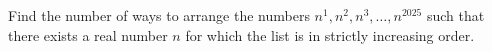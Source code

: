 Find the number of ways to arrange the numbers $n^1,n^2,n^3,\dots,n^{2025}$ such that there exists a real number $n$ for which the list is in strictly increasing order.
